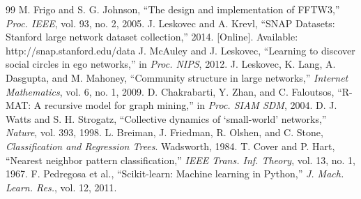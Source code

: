 \documentclass[conference]{IEEEtran}
\begin{document}
\begin{thebibliography}{99}
 M. Frigo and S. G. Johnson, ``The design and implementation of FFTW3,'' \emph{Proc. IEEE}, vol. 93, no. 2, 2005.
 J. Leskovec and A. Krevl, ``SNAP Datasets: Stanford large network dataset collection,'' 2014. [Online]. Available: http://snap.stanford.edu/data
 J. McAuley and J. Leskovec, ``Learning to discover social circles in ego networks,'' in \emph{Proc. NIPS}, 2012.
 J. Leskovec, K. Lang, A. Dasgupta, and M. Mahoney, ``Community structure in large networks,'' \emph{Internet Mathematics}, vol. 6, no. 1, 2009.
 D. Chakrabarti, Y. Zhan, and C. Faloutsos, ``R-MAT: A recursive model for graph mining,'' in \emph{Proc. SIAM SDM}, 2004.
 D. J. Watts and S. H. Strogatz, ``Collective dynamics of `small-world' networks,'' \emph{Nature}, vol. 393, 1998.
 L. Breiman, J. Friedman, R. Olshen, and C. Stone, \emph{Classification and Regression Trees}. Wadsworth, 1984.
 T. Cover and P. Hart, ``Nearest neighbor pattern classification,'' \emph{IEEE Trans. Inf. Theory}, vol. 13, no. 1, 1967.
 F. Pedregosa et al., ``Scikit-learn: Machine learning in Python,'' \emph{J. Mach. Learn. Res.}, vol. 12, 2011.
\end{thebibliography}
\end{document}
